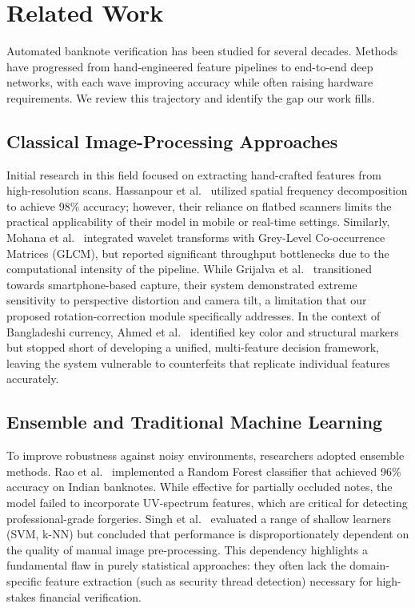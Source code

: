 \documentclass[journal]{IEEEtran}
\begin{document}
\section{Related Work}
\label{sec:related}
Automated banknote verification has been studied for several decades. Methods have progressed from hand-engineered feature pipelines to end-to-end deep networks, with each wave improving accuracy while often raising hardware requirements. We review this trajectory and identify the gap our work fills.

\subsection{Classical Image-Processing Approaches}

Initial research in this field focused on extracting hand-crafted features from high-resolution scans. Hassanpour et al.~\cite{hassanpour2007} utilized spatial frequency decomposition to achieve 98\% accuracy; however, their reliance on flatbed scanners limits the practical applicability of their model in mobile or real-time settings. Similarly, Mohana et al.~\cite{mohana2019} integrated wavelet transforms with Grey-Level Co-occurrence Matrices (GLCM), but reported significant throughput bottlenecks due to the computational intensity of the pipeline. While Grijalva et al.~\cite{grijalva2010} transitioned towards smartphone-based capture, their system demonstrated extreme sensitivity to perspective distortion and camera tilt, a limitation that our proposed rotation-correction module specifically addresses. In the context of Bangladeshi currency, Ahmed et al.~\cite{ahmed2014} identified key color and structural markers but stopped short of developing a unified, multi-feature decision framework, leaving the system vulnerable to counterfeits that replicate individual features accurately.

\subsection{Ensemble and Traditional Machine Learning}

To improve robustness against noisy environments, researchers adopted ensemble methods. Rao et al.~\cite{rao2020} implemented a Random Forest classifier that achieved 96\% accuracy on Indian banknotes. While effective for partially occluded notes, the model failed to incorporate UV-spectrum features, which are critical for detecting professional-grade forgeries. Singh et al.~\cite{singh2020} evaluated a range of shallow learners (SVM, k-NN) but concluded that performance is disproportionately dependent on the quality of manual image pre-processing. This dependency highlights a fundamental flaw in purely statistical approaches: they often lack the domain-specific feature extraction (such as security thread detection) necessary for high-stakes financial verification.
\end{document}
